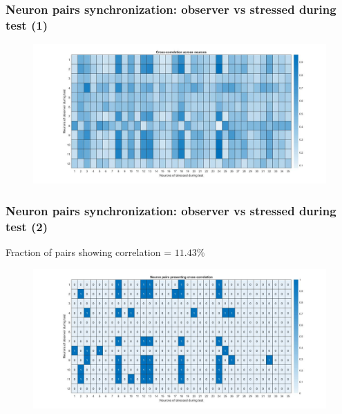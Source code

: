 \documentclass{beamer}
\begin{document}
\begin{frame}
\frametitle{Neuron pairs synchronization: observer vs stressed during test (1)}





\begin{figure}[H]
	\begin{center}
		\hspace*{-1cm}
		\includegraphics[scale=.30]{cc_heatmap.jpg} 
	\end{center}  
	
	
\end{figure}


\end{frame}	




\begin{frame}
\frametitle{Neuron pairs synchronization: observer vs stressed during test (2)}


Fraction of pairs showing correlation = $11.43 \%$


\begin{figure}[H]
	\begin{center}
		\hspace*{-1cm}
		\includegraphics[scale=.30]{cc_active.jpg} 
	\end{center}  
	
	
\end{figure}


\end{frame}	
\end{document}
